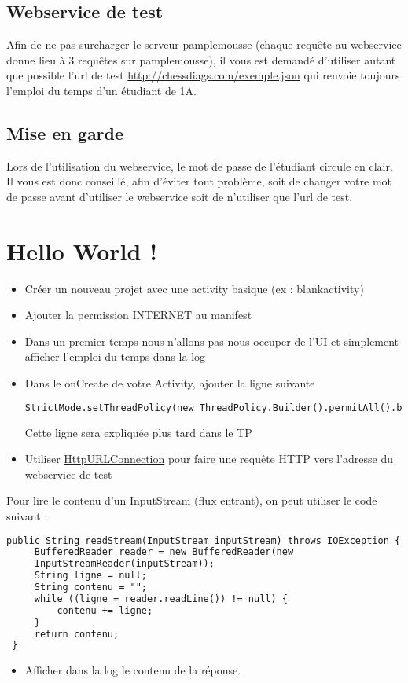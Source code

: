 \documentclass{article}
\begin{document}
\subsection{Webservice de test}
Afin de ne pas surcharger le serveur pamplemousse (chaque requête au webservice
donne lieu à 3 requêtes sur pamplemousse), il vous est demandé d'utiliser
autant que possible l'url de test
\href{http://chessdiags.com/exemple.json}{http://chessdiags.com/exemple.json}
qui renvoie toujours l'emploi du temps d'un étudiant de 1A.
\subsection{Mise en garde}
Lors de l'utilisation du webservice, le mot de passe de l'étudiant
circule en clair. Il vous est donc conseillé, afin d'éviter tout problème, soit
de changer votre mot de passe avant d'utiliser le webservice soit de n'utiliser
que l'url de test.
\section{Hello World !}
\begin{itemize} 
  \item Créer un nouveau projet avec une activity basique (ex : blankactivity)
  \item Ajouter la permission INTERNET au manifest
  \item Dans un premier temps nous n'allons pas nous occuper de l'UI et
  simplement afficher l'emploi du temps dans la log
  \item Dans le onCreate de votre Activity, ajouter la ligne suivante 
\begin{lstlisting}[language=XML]
StrictMode.setThreadPolicy(new ThreadPolicy.Builder().permitAll().build());
\end{lstlisting}
Cette ligne sera expliquée plus tard dans le TP
  \item Utiliser
  \href{http://developer.android.com/reference/java/net/HttpURLConnection.html}{HttpURLConnection}
  pour faire une requête HTTP vers l'adresse du webservice de test
\end{itemize}
Pour lire le contenu d'un InputStream (flux entrant), on peut utiliser le code
suivant :
 \begin{lstlisting}[language=XML]
 public String readStream(InputStream inputStream) throws IOException {
     BufferedReader reader = new BufferedReader(new
     InputStreamReader(inputStream)); 
     String ligne = null;
     String contenu = "";
     while ((ligne = reader.readLine()) != null) {
         contenu += ligne;
     }
     return contenu;
 }
\end{lstlisting}
\begin{itemize} 
  \item Afficher dans la log le contenu de la réponse.
\end{itemize}
\end{document}
